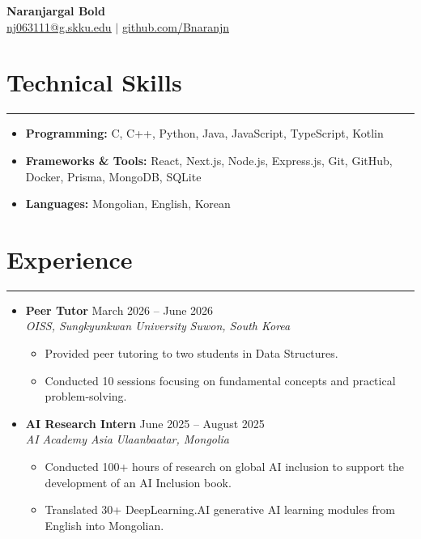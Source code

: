 \documentclass[letterpaper, 10pt]{article}
\begin{document}
\begin{center}
    \textbf{\LARGE Naranjargal Bold} \\ \vspace{2pt}
    \href{mailto:YOUR_EMAIL@skku.edu}
    {\underline{nj063111@g.skku.edu}} $|$
    \href{https://github.com/GITHUB_ID}
    {\underline{github.com/Bnaranjn}}
\end{center}

\section*{Technical Skills}
\hrule
\vspace{4pt}

\begin{itemize}[label={}, leftmargin=0pt]
    \item \textbf{Programming:} C, C++, Python, Java, JavaScript, TypeScript, Kotlin
    \item \textbf{Frameworks \& Tools:} React, Next.js, Node.js, Express.js, Git, GitHub, Docker, Prisma, MongoDB, SQLite
    \item \textbf{Languages:} Mongolian, English, Korean
\end{itemize}

\section*{Experience}
\hrule
\vspace{4pt}

\begin{itemize}[label={}, leftmargin=0pt]

    \item
    \textbf{Peer Tutor} \hfill March 2026 -- June 2026 \\
    \textit{OISS, Sungkyunkwan University} \hfill
    \textit{Suwon, South Korea}
    \begin{itemize}
        \item Provided peer tutoring to two students in Data Structures.
        \item Conducted 10 sessions focusing on fundamental concepts and practical problem-solving.
    \end{itemize}

    \item
    \textbf{AI Research Intern} \hfill June 2025 -- August 2025 \\
    \textit{AI Academy Asia} \hfill
    \textit{Ulaanbaatar, Mongolia}
    \begin{itemize}
        \item Conducted 100+ hours of research on global AI inclusion to support the development of an AI Inclusion book.
        \item Translated 30+ DeepLearning.AI generative AI learning modules from English into Mongolian.
    \end{itemize}

\end{itemize}
\end{document}
